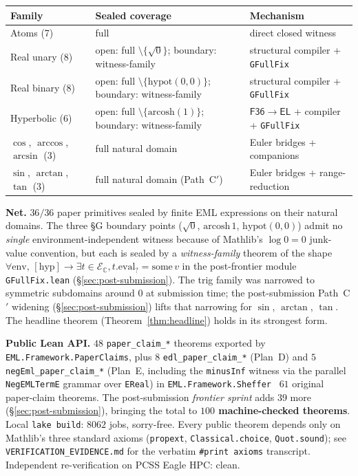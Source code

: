\documentclass[11pt]{article}
\newcommand{\F}{\mathsf{F36}}
\newcommand{\EL}{\mathsf{EL}}
\newcommand{\EsetC}{\mathcal{E}_{\mathbb{C}}}
\theoremstyle{plain}
\theoremstyle{definition}
\begin{document}
\begin{center}
\begin{tabularx}{\textwidth}{@{}l X X@{}}
\toprule
\textbf{Family} & \textbf{Sealed coverage} & \textbf{Mechanism} \\
\midrule
Atoms (7)              & full                                                & direct closed witness \\
Real unary (8)         & open: full $\setminus \{\sqrt{0}\}$; boundary: witness-family & structural compiler + \texttt{GFullFix} \\
Real binary (8)        & open: full $\setminus \{\mathrm{hypot}(0,0)\}$; boundary: witness-family & structural compiler + \texttt{GFullFix} \\
Hyperbolic (6)         & open: full $\setminus \{\mathrm{arcosh}(1)\}$; boundary: witness-family & $\F\to\EL$ + compiler + \texttt{GFullFix} \\
$\cos$, $\arccos$, $\arcsin$ (3) & full natural domain                       & Euler bridges + companions \\
$\sin$, $\arctan$, $\tan$ (3) & full natural domain (Path~C$'$)             & Euler bridges + range-reduction \\
\bottomrule
\end{tabularx}
\end{center}

\medskip

\noindent\textbf{Net.} $36/36$ paper primitives sealed by finite EML
expressions on their natural domains. The three §G boundary points
($\sqrt{0}$, $\mathrm{arcosh}\,1$, $\mathrm{hypot}(0,0)$) admit no
\emph{single} environment-independent witness because of Mathlib's
$\log 0 = 0$ junk-value convention, but each is sealed by a
\emph{witness-family} theorem of the shape
$\forall \mathrm{env},\,[\mathrm{hyp}] \to \exists t \in \EsetC,
t.\mathrm{eval}_? = \mathrm{some}\,v$
in the post-frontier module \texttt{GFullFix.lean}
(\S\ref{sec:post-submission}). The trig family was narrowed to
symmetric subdomains around $0$ at submission time; the post-submission
Path~C$'$ widening (\S\ref{sec:post-submission}) lifts that narrowing
for $\sin$, $\arctan$, $\tan$. The headline theorem
(Theorem~\ref{thm:headline}) holds in its strongest form.

\medskip

\noindent\textbf{Public Lean API.} $48$ \texttt{paper\_claim\_*}
theorems exported by \texttt{EML.Framework.PaperClaims}, plus $8$
\texttt{edl\_paper\_claim\_*} (Plan~D) and $5$
\texttt{negEml\_paper\_claim\_*} (Plan~E, including the
\texttt{minusInf} witness via the parallel
\texttt{NegEMLTermE} grammar over \texttt{EReal}) in
\texttt{EML.Framework.Sheffer} \textemdash\ $61$ original
paper-claim theorems. The post-submission \emph{frontier sprint}
adds $39$ more (\S\ref{sec:post-submission}), bringing the total
to \textbf{$100$ machine-checked theorems}. Local \texttt{lake build}:
$8062$ jobs, sorry-free. Every public theorem depends only on
Mathlib's three standard axioms (\texttt{propext},
\texttt{Classical.choice}, \texttt{Quot.sound}); see
\texttt{VERIFICATION\_EVIDENCE.md} for the verbatim
\texttt{\#print axioms} transcript. Independent re-verification on
PCSS Eagle HPC: clean.
\end{document}

